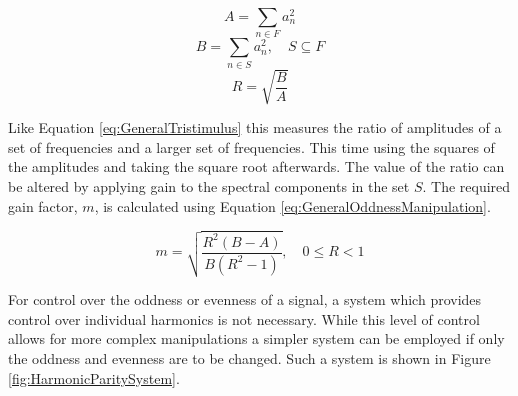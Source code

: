 		\[ A = \sum_{n \in F} a_{n}^{2} \]
		\[ B = \sum_{n \in S} a_{n}^{2}, \quad S \subseteq F \]
		\begin{equation}
			R = \sqrt{\frac{B}{A}}
			\label{eq:GeneralOddness}
		\end{equation}

		Like Equation \ref{eq:GeneralTristimulus} this measures the ratio of amplitudes of a set of frequencies and
		a larger set of frequencies. This time using the squares of the amplitudes and taking the square root
		afterwards. The value of the ratio can be altered by applying gain to the spectral components in the set
		$S$. The required gain factor, $m$, is calculated using Equation \ref{eq:GeneralOddnessManipulation}.

		\begin{equation}
			m = \sqrt{\frac{R^{2}(B - A)}{B(R^{2} - 1)}}, \quad 0 \leq R < 1
			\label{eq:GeneralOddnessManipulation}
		\end{equation}

		For control over the oddness or evenness of a signal, a system which provides control over individual
		harmonics is not necessary. While this level of control allows for more complex manipulations a simpler
		system can be employed if only the oddness and evenness are to be changed.  Such a system is shown in
		Figure \ref{fig:HarmonicParitySystem}.

